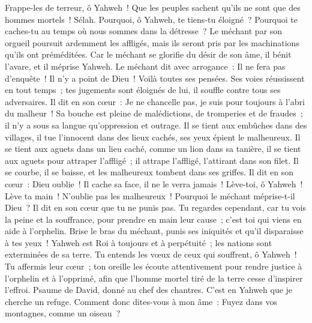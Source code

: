 \begin{multicols}{2}
Frappe-les de terreur, ô Yahweh~! Que les peuples sachent qu'ils ne sont que des hommes mortels~! Sélah.
\VerseOne{}Pourquoi, ô Yahweh, te tiens-tu éloigné~? Pourquoi te caches-tu au temps où nous sommes dans la détresse~?
Le méchant par son orgueil poursuit ardemment les affligés, mais ils seront pris par les machinations qu'ils ont préméditées.
Car le méchant se glorifie du désir de son âme, il bénit l'avare, et il méprise Yahweh.
Le méchant dit avec arrogance~: Il ne fera pas d'enquête~! Il n'y a point de Dieu~! Voilà toutes ses pensées.
Ses voies réussissent en tout temps~; tes jugements sont éloignés de lui, il souffle contre tous ses adversaires.
Il dit en son cœur~: Je ne chancelle pas, je suis pour toujours à l'abri du malheur~!
Sa bouche est pleine de malédictions, de tromperies et de fraudes~; il n'y a sous sa langue qu'oppression et outrage.
Il se tient aux embûches dans des villages, il tue l'innocent dans des lieux cachés, ses yeux épient le malheureux.
Il se tient aux aguets dans un lieu caché, comme un lion dans sa tanière, il se tient aux aguets pour attraper l'affligé~; il attrape l'affligé, l'attirant dans son filet.
Il se courbe, il se baisse, et les malheureux tombent dans ses griffes.
Il dit en son cœur~: Dieu oublie~! Il cache sa face, il ne le verra jamais~!
Lève-toi, ô Yahweh~! Lève ta main~! N'oublie pas les malheureux~!
Pourquoi le méchant méprise-t-il Dieu~? Il dit en son cœur que tu ne punis pas.
Tu regardes cependant, car tu vois la peine et la souffrance, pour prendre en main leur cause~; c'est toi qui viens en aide à l'orphelin.
Brise le bras du méchant, punis ses iniquités et qu'il disparaisse à tes yeux~!
Yahweh est Roi à toujours et à perpétuité~; les nations sont exterminées de sa terre.
Tu entends les vœux de ceux qui souffrent, ô Yahweh~! Tu affermis leur cœur~; ton oreille les écoute attentivement
pour rendre justice à l'orphelin et à l'opprimé, afin que l'homme mortel tiré de la terre cesse d'inspirer l'effroi.
\VerseOne{}Psaume de David, donné au chef des chantres. C'est en Yahweh que je cherche un refuge. Comment donc dites-vous à mon âme~: Fuyez dans vos montagnes, comme un oiseau~?

\end{multicols}
